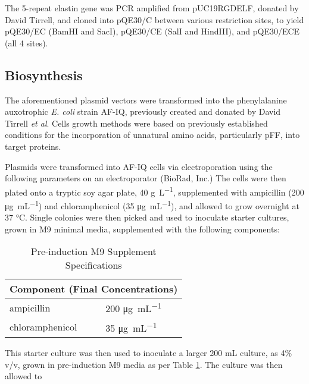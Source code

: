 \begin{refsection}
The 5-repeat elastin gene was PCR amplified from pUC19RGDELF, donated by David
Tirrell, and cloned into pQE30/C between various restriction sites, to yield
pQE30/EC (BamHI and SacI), pQE30/CE (SalI and HindIII), and pQE30/ECE (all 4
sites).

\subsection{Biosynthesis}

The aforementioned plasmid vectors were transformed into the phenylalanine
auxotrophic \emph{E. coli} strain AF-IQ, previously created and donated by David
Tirrell \emph{et al}.\cite{Yoshikawa1994,} Cells growth methods were based on
previously established conditions for the incorporation of unnatural amino
acids, particularly pFF, into target
proteins.\cite{Voloshchuk2009,Yoshikawa1994}

Plasmids were transformed into AF-IQ cells via electroporation using the
following parameters on an electroporator (BioRad, Inc.) The cells were then
plated onto a tryptic soy agar plate, 40
\si[inter-unit-product=\ensuremath{{}\cdot{}}]{\g\per\L},
supplemented with ampicillin (200 
\si[inter-unit-product=\ensuremath{{}\cdot{}}]{\ug\per\mL})
and chloramphenicol (35
\si[inter-unit-product=\ensuremath{{}\cdot{}}]{\ug\per\mL}), and
allowed to grow overnight at 37 \si{\celsius}. Single colonies were then picked
and used to inoculate starter cultures, grown in M9 minimal media, supplemented
with the following components:

\begin{table}
    \centering
\begin{tabular}{ |l|l| }
  \hline
  \multicolumn{2}{|c|}{Component (Final Concentrations)} \\
  \hline

  ampicillin & 200 
\si[inter-unit-product=\ensuremath{{}\cdot{}}]{\ug\per\mL} \\
  chloramphenicol & 35 
\si[inter-unit-product=\ensuremath{{}\cdot{}}]{\ug\per\mL} \\

  \hline
\end{tabular}
\caption{Pre-induction M9 Supplement Specifications}
\label{tab:preinduction_recipe}
\end{table}

This starter culture was then used to inoculate a larger 200 \si{mL} culture, as
4\% v/v, grown in pre-induction M9 media as per Table \ref{tab:preinduction_recipe}.
The culture was then allowed to 


\end{refsection}
